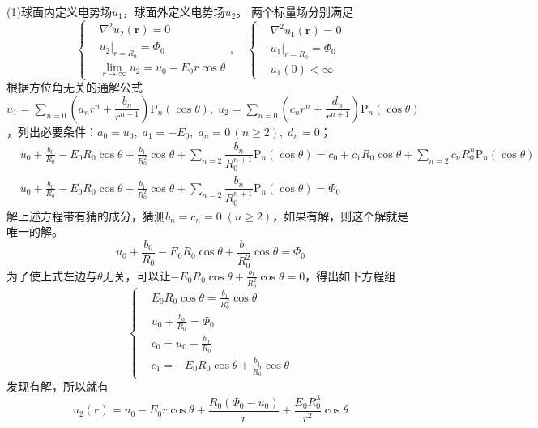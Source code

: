 \documentclass{mynote}
\newcommand{\lP}{\mathrm{P}}
\begin{document}
\begin{solution}
    (1)球面内定义电势场$u_1$，球面外定义电势场$u_2$。
    两个标量场分别满足
    \[
    \left\{
        \begin{aligned}
            & \nabla^2 u_2(\bm{r}) = 0\\
            & u_2 |_{r=R_0} = \varPhi_0 \\
            & \lim_{r\to \infty} u_2 = u_0 - E_0 r \cos \theta
        \end{aligned} 
    \right. ,\quad
    \left\{
        \begin{aligned}
            & \nabla^2 u_1(\bm{r}) = 0\\
            & u_1 |_{r=R_0} = \varPhi_0 \\
            & u_1(0) < \infty
        \end{aligned} 
    \right.   
    \]
    根据方位角无关的通解公式$u_1 = \displaystyle\sum_{n=0} \left( a_n r^n + \dfrac{b_n}{r^{n+1}} \right) \lP_n(\cos \theta),\; u_2 = \displaystyle\sum_{n=0} \left( c_n r^n + \dfrac{d_n}{r^{n+1}} \right) \lP_n(\cos \theta)$，列出必要条件：$a_0 = u_0,\; a_1 = -E_0,\; a_n = 0\, (n \geq 2),\; d_n = 0$；
    \begin{align*}
        & u_0 + \frac{b_0}{R_0} - E_0 R_0 \cos \theta + \frac{b_1}{R_0^2} \cos \theta + \sum_{n=2} \dfrac{b_n}{R_0^{n+1}} \lP_n(\cos \theta) = c_0 + c_1 R_0 \cos \theta + \sum_{n=2} c_n R_0^n \lP_n(\cos \theta) \\
        & u_0 + \frac{b_0}{R_0} - E_0 R_0 \cos \theta + \frac{b_1}{R_0^2} \cos \theta + \sum_{n=2} \dfrac{b_n}{R_0^{n+1}} \lP_n(\cos \theta) = \varPhi_0
    \end{align*}
    解上述方程带有猜的成分，猜测$b_n = c_n = 0\; (n\geq 2)$，如果有解，则这个解就是唯一的解。
    \[
        u_0 + \frac{b_0}{R_0} - E_0 R_0 \cos \theta + \frac{b_1}{R_0^2} \cos \theta = \varPhi_0
    \]
    为了使上式左边与$\theta$无关，可以让$ - E_0 R_0 \cos \theta + \frac{b_1}{R_0^2} \cos \theta = 0$，得出如下方程组
    \[
    \left\{
        \begin{aligned}
            & E_0 R_0 \cos \theta = \frac{b_1}{R_0^2} \cos \theta \\
            & u_0 + \frac{b_0}{R_0} = \varPhi_0 \\
            & c_0 = u_0 + \frac{b_0}{R_0} \\
            & c_1 = - E_0 R_0 \cos \theta + \frac{b_1}{R_0^2} \cos \theta
        \end{aligned} 
    \right.    
    \]
    发现有解，所以就有
    \[
    u_2(\bm{r}) = u_0 - E_0 r \cos \theta + \frac{R_0 (\varPhi_0 - u_0)}{r} + \frac{E_0 R_0^3}{r^2} \cos \theta
    \]


\end{solution}
\end{document}
